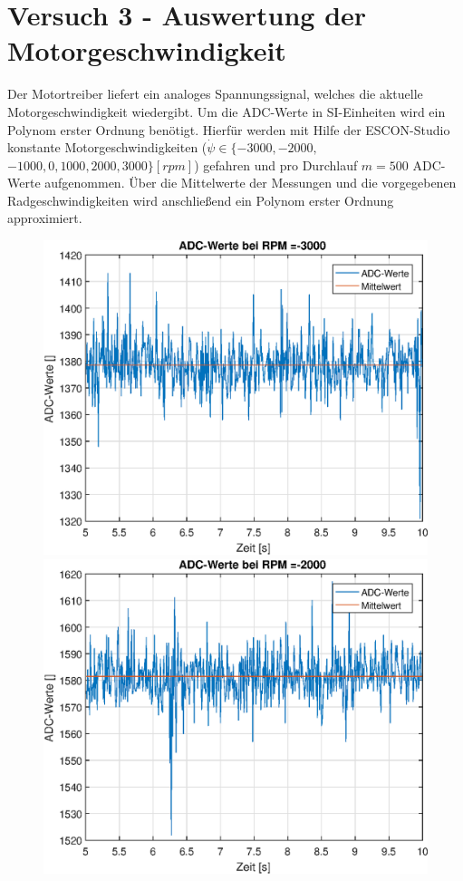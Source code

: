 \section{Versuch 3 - Auswertung der Motorgeschwindigkeit}
Der Motortreiber liefert ein analoges Spannungssignal, welches die aktuelle Motorgeschwindigkeit wiedergibt. Um die ADC-Werte in SI-Einheiten wird ein Polynom erster Ordnung benötigt. Hierfür werden mit Hilfe der ESCON-Studio konstante Motorgeschwindigkeiten ($\dot{\psi} \in \{ -3000, -2000,$  $-1000, 0, 1000, 2000, 3000 \} [rpm] $) gefahren und pro Durchlauf $m=500$ ADC-Werte aufgenommen. Über die Mittelwerte der Messungen und die vorgegebenen Radgeschwindigkeiten wird anschließend ein Polynom erster Ordnung approximiert.

\begin{figure}[h]
	\includegraphics[width=0.5\linewidth]{img/adc_values_rpm_-3000.eps}
	\includegraphics[width=0.5\linewidth]{img/adc_values_rpm_-2000.eps}
\end{figure}
